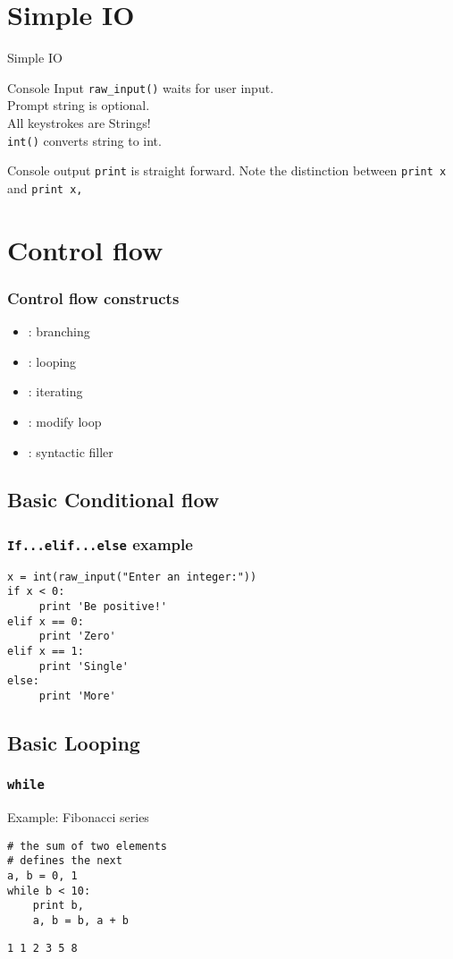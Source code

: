 \documentclass[14pt,compress]{beamer}
\newcounter{time}
\newcommand{\inctime}[1]{\addtocounter{time}{#1}{\tiny \thetime\ m}}
\newcommand{\typ}[1]{\texttt{#1}}
\newcommand{\kwrd}[1]{ \texttt{\textbf{\color{blue}{#1}}}  }
\begin{document}
\section{Simple IO}
\begin{frame}{Simple IO}
  \begin{block}
    {Console Input}
    \texttt{raw\_input()} waits for user input.\\Prompt string is optional.\\
    All keystrokes are Strings!\\\texttt{int()} converts string to int.
  \end{block}
  \begin{block}
    {Console output}
    \texttt{print} is straight forward. Note the distinction between \texttt{print x} and \texttt{print x,}
  \end{block}
\end{frame}

\section{Control flow}
\begin{frame}
  \frametitle{Control flow constructs}  
  \begin{itemize}
  \item \kwrd{if/elif/else}: branching
  \item \kwrd{while}: looping
  \item \kwrd{for}: iterating 
  \item \kwrd{break, continue}: modify loop 
  \item \kwrd{pass}: syntactic filler
  \end{itemize}
\end{frame}

\subsection{Basic Conditional flow}
\begin{frame}[fragile]
  \frametitle{\typ{If...elif...else} example}
  \begin{lstlisting}
x = int(raw_input("Enter an integer:"))
if x < 0:
     print 'Be positive!'
elif x == 0:
     print 'Zero'
elif x == 1:
     print 'Single'
else:
     print 'More'
  \end{lstlisting}
  \inctime{10}
\end{frame}

\subsection{Basic Looping}
\begin{frame}[fragile]
  \frametitle{\typ{while}}
Example: Fibonacci series
  \begin{lstlisting}
# the sum of two elements
# defines the next
a, b = 0, 1
while b < 10:
    print b,
    a, b = b, a + b 
\end{lstlisting}
\typ{1 1 2 3 5 8}\\  
\end{frame}
\end{document}
